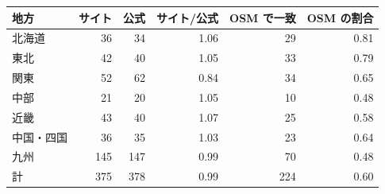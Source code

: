 \begin{tabular}{lrrrrr}
\toprule
地方 & サイト & 公式 & サイト/公式 & OSM で一致 & OSM の割合 \\
\midrule
北海道 & 36 & 34 & 1.06 & 29 & 0.81 \\
東北 & 42 & 40 & 1.05 & 33 & 0.79 \\
関東 & 52 & 62 & 0.84 & 34 & 0.65 \\
中部 & 21 & 20 & 1.05 & 10 & 0.48 \\
近畿 & 43 & 40 & 1.07 & 25 & 0.58 \\
中国・四国 & 36 & 35 & 1.03 & 23 & 0.64 \\
九州 & 145 & 147 & 0.99 & 70 & 0.48 \\
\midrule
計 & 375 & 378 & 0.99 & 224 & 0.60 \\
\bottomrule
\end{tabular}

